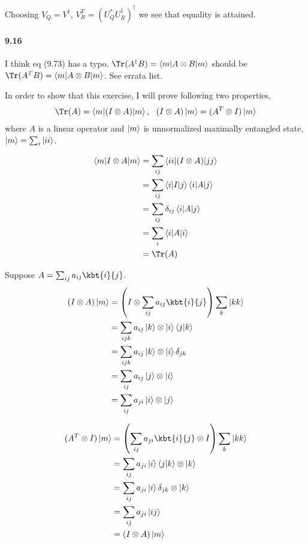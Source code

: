 Choosing $V_Q = V^\dagger$, $V_R^T = (U_Q^* U_R^\dagger)^\dagger$ we see that equality is attained.


\paragraph{9.16}
I think eq (9.73) has a typo. $\Tr (A^\dagger B) = \braket{m | A \otimes B | m}$ should be $\Tr (A^{\textcolor{red}{T}} B) = \braket{m | A \otimes B | m}$. See errata list.

In order to show that this exercise, I will prove following two properties,
\begin{align*}
    \Tr(A) = \braket{m | (I \otimes A) | m}, ~~ (I \otimes A)\ket{ m} = (A^T \otimes I)\ket{m}
\end{align*}
where $A$ is a linear operator and $\ket{m}$ is unnormalized maximally entangled state, $\ket{m} = \sum_i \ket{ii}$.

\begin{align*}
    \braket{m |I \otimes A| m} &= \sum_{ij} \braket{ii | (I \otimes A) | jj}\\
        &= \sum_{ij} \braket{i | I | j} \braket{i | A | j}\\
        &= \sum_{ij} \delta_{ij} \braket{i | A | j}\\
        &= \sum_i \braket{i | A | i}\\
        &= \Tr (A)
\end{align*}

Suppose $A = \sum_{ij} a_{ij} \kbt{i}{j}$.
\begin{align*}
     (I \otimes A)\ket{ m} &= \left(I \otimes  \sum_{ij} a_{ij} \kbt{i}{j}\right) \sum_k \ket{kk}\\
        &= \sum_{ijk} a_{ij} \ket{k} \otimes \ket{i} \braket{j | k}\\
        &= \sum_{ijk} a_{ij} \ket{k} \otimes \ket{i} \delta_{jk}\\
        &= \sum_{ij} a_{ij} \ket{j} \otimes \ket{i}\\
        &= \sum_{ij} a_{ji} \ket{i} \otimes \ket{j}
\end{align*}

\begin{align*}
    (A^T \otimes I) \ket{m} &= \left(\sum_{ij} a_{ji} \kbt{i}{j} \otimes I\right) \sum_k \ket{kk}\\
        &= \sum_{ij} a_{ji} \ket{i} \braket{j | k} \otimes \ket{k}\\
        &= \sum_{ij} a_{ji} \ket{i} \delta_{jk} \otimes \ket{k}\\
        &= \sum_{ij} a_{ji} \ket{ij}\\
        &= (I \otimes A)\ket{ m }
\end{align*}

